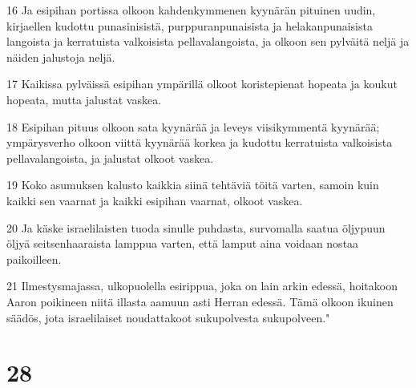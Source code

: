 \par 16 Ja esipihan portissa olkoon kahdenkymmenen kyynärän pituinen uudin, kirjaellen kudottu punasinisistä, purppuranpunaisista ja helakanpunaisista langoista ja kerratuista valkoisista pellavalangoista, ja olkoon sen pylväitä neljä ja näiden jalustoja neljä.
\par 17 Kaikissa pylväissä esipihan ympärillä olkoot koristepienat hopeata ja koukut hopeata, mutta jalustat vaskea.
\par 18 Esipihan pituus olkoon sata kyynärää ja leveys viisikymmentä kyynärää; ympärysverho olkoon viittä kyynärää korkea ja kudottu kerratuista valkoisista pellavalangoista, ja jalustat olkoot vaskea.
\par 19 Koko asumuksen kalusto kaikkia siinä tehtäviä töitä varten, samoin kuin kaikki sen vaarnat ja kaikki esipihan vaarnat, olkoot vaskea.
\par 20 Ja käske israelilaisten tuoda sinulle puhdasta, survomalla saatua öljypuun öljyä seitsenhaaraista lamppua varten, että lamput aina voidaan nostaa paikoilleen.
\par 21 Ilmestysmajassa, ulkopuolella esirippua, joka on lain arkin edessä, hoitakoon Aaron poikineen niitä illasta aamuun asti Herran edessä. Tämä olkoon ikuinen säädös, jota israelilaiset noudattakoot sukupolvesta sukupolveen."

\chapter{28}

